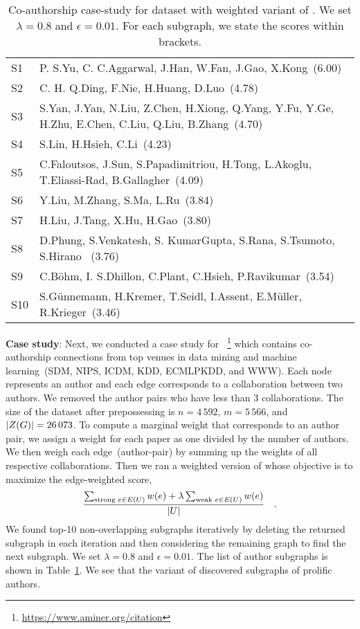 \begin{table}[ht!]
\caption{Co-authorship case-study for  dataset with weighted variant of \algip. We set $\lambda = 0.8$ and $\epsilon = 0.01$. For each subgraph, we state the scores within brackets.
}
\label{tab:dblp-lam-ip-w}
\begin{tabular*}{\columnwidth} { l p{7.4cm}}
\toprule
S1 & P. S.Yu, C. C.Aggarwal, J.Han, W.Fan, J.Gao, X.Kong~(6.00)  \\
S2 & C. H. Q.Ding, F.Nie, H.Huang, D.Luo~(4.78) \\
S3 & S.Yan, J.Yan, N.Liu, Z.Chen, H.Xiong, Q.Yang, Y.Fu, Y.Ge, H.Zhu, E.Chen, C.Liu, Q.Liu, B.Zhang~(4.70)\\
S4 & S.Lin, H.Hsieh, C.Li~(4.23)\\
S5 & C.Faloutsos, J.Sun, S.Papadimitriou, H.Tong, L.Akoglu, T.Eliassi-Rad, B.Gallagher~(4.09)\\
S6 & Y.Liu, M.Zhang, S.Ma, L.Ru~(3.84)\\
S7 & H.Liu, J.Tang, X.Hu, H.Gao~(3.80)\\
S8 & D.Phung, S.Venkatesh, S. KumarGupta, S.Rana, S.Tsumoto, S.Hirano~ (3.76)\\
S9 & C.Böhm, I. S.Dhillon, C.Plant, C.Hsieh, P.Ravikumar~(3.54)\\
S10 & S.Günnemann, H.Kremer, T.Seidl, I.Assent, E.Müller, R.Krieger~(3.46) \\
\bottomrule
\end{tabular*}
\end{table}

\textbf{Case study}: Next, we conducted a case study for 
~\cite{tang2008arnetminer}\footnote{\url{https://www.aminer.org/citation}} which contains co-authorship connections from top venues in data mining and machine learning~(SDM, NIPS, ICDM, KDD, ECMLPKDD, and WWW). Each node represents an author and each edge corresponds to a collaboration between two authors.
We removed the author pairs who have less than $3$ collaborations. The size of the dataset after prepossessing is $n = 4\,592$, $m =  5\,566$, and ${\left|Z(G)\right|} =  26\,073$. To compute a marginal weight that corresponds to an author pair, we assign a weight for each paper as one divided by the number of authors. We then weigh each edge~(author-pair) by summing up the weights of all respective collaborations.
Then we ran a weighted version of \algip whose objective is to maximize the edge-weighted score,
\[
\frac{\sum_{\text{strong } e \in E(U)}w(e) + \lambda \sum_{\text{weak } e \in E(U)}w(e)}{{\left|U\right|}}\quad. 
\]
We found top-10 non-overlapping subgraphs iteratively by deleting the returned subgraph in each iteration and then considering the remaining graph to find the next subgraph.
We set $\lambda = 0.8$ and $\epsilon = 0.01$. The list of author subgraphs is shown in Table~\ref{tab:dblp-lam-ip-w}. 
We see that the variant of \algip discovered subgraphs of prolific authors. 
